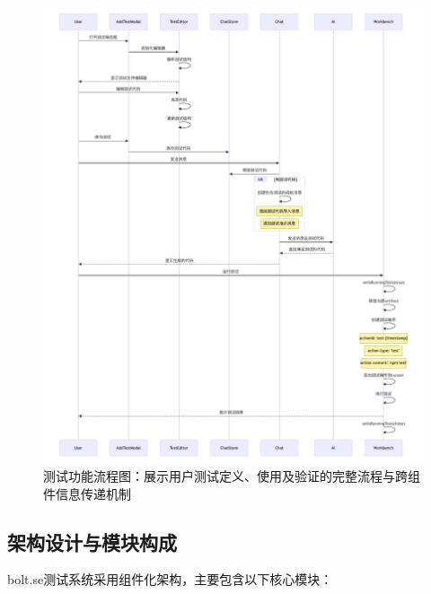 \begin{figure}[htbp]
  \centering
  \includegraphics[width=\textwidth]{figures/bolt_test_sequence.pdf}
  \caption{测试功能流程图：展示用户测试定义、使用及验证的完整流程与跨组件信息传递机制}
  \label{fig:test_sequence}
\end{figure}

\subsection{架构设计与模块构成}

bolt.se测试系统采用组件化架构，主要包含以下核心模块：

